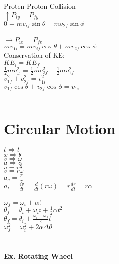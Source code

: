 \documentclass[]{article}
\date{}
\title{\docTitle}
\author{\docAuthor}
\date{\today}
\begin{document}
\maketitle
Proton-Proton Collision\\
$\uparrow P_{iy} = P_{fy}$\\
$0 = mv_{if}\sin\theta - mv_{2f}\sin\phi$\\
\\
$\rightarrow P_{ix} = P_{fx}$\\
$mv_{1i} = mv_{if}\cos\theta + mv_{2f}\cos\phi$\\
Conservation of KE:\\
$KE_i = KE_f$\\
$\frac{1}{2}mv^{2}_{1i} = \frac{1}{2}mv^{2}_{2f} + \frac{1}{2}mv^{2}_{1f}$\\
$v_{1f}^2 + v_{2f}^2 = v_{1i}^2$\\
$v_{1f}\cos\theta + v_{2f}\cos\phi = v_{1i}$\\
\\
\section*{Circular Motion}
$t \Rightarrow t$\\
$x \Rightarrow \theta$\\
$v \Rightarrow \omega$\\
$a \Rightarrow \alpha$\\
$s = r\theta$\\
$v = r\omega$\\
$a_c = \frac{v^2}{r}$\\
$a_t = \frac{dv}{dt} = \frac{d}{dt}(r\omega) = r \frac{dr}{dt} = r\alpha$\\
\\
$\omega_f = \omega_i+\alpha{t}$\\
$\theta_f = \theta_i+\omega_it + \frac{1}{2}\alpha t^2$\\
$\theta_f = \theta_i+\frac{\omega_i+\omega_f}{2}t$\\
$\omega_f^2=\omega_i^2+2\alpha\Delta\theta$\\
\\
\\
\textbf{Ex. Rotating Wheel}
\end{document}
